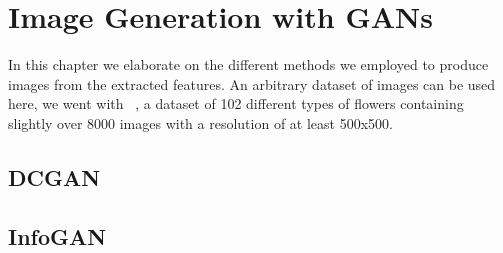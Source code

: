 \chapter{Image Generation with GANs}
    In this chapter we elaborate on the different methods we employed to produce images from the extracted features. An arbitrary dataset of images can be used here, we went with ~\cite{102flower}, a dataset of 102 different types of flowers containing slightly over 8000 images with a resolution of at least 500x500.
    
    \section{DCGAN}

    \section{InfoGAN}
